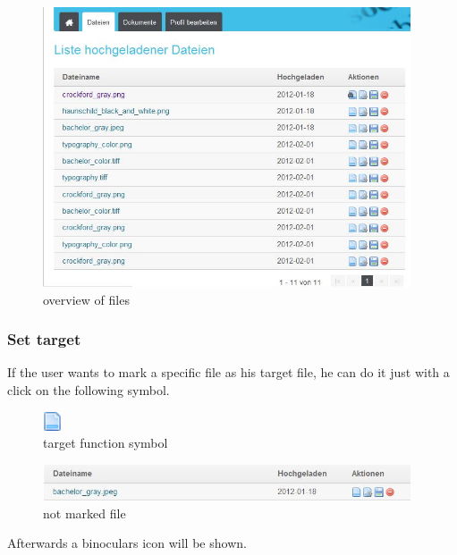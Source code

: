 \begin{figure}[!ht]
  \centering
    \includegraphics[width=0.97\textwidth]{images/basic_functionalities/dateien.jpg}
  \caption{overview of files}
  \label{fig:einloggen}
\end{figure}

\subsubsection{Set target}

If the user wants to mark a specific file as his target file, he can do it just with a click on the following symbol.

\begin{figure}[!ht]
  \centering
    \includegraphics[width=0.05\textwidth]{images/page.png}
  \caption{target function symbol}
  \label{fig:einloggen}
\end{figure}

\begin{figure}[!ht]
  \centering
    \includegraphics[width=0.97\textwidth]{images/basic_functionalities/set_target1.jpg}
  \caption{not marked file}
  \label{fig:einloggen}
\end{figure}

Afterwards a binoculars icon will be shown.

